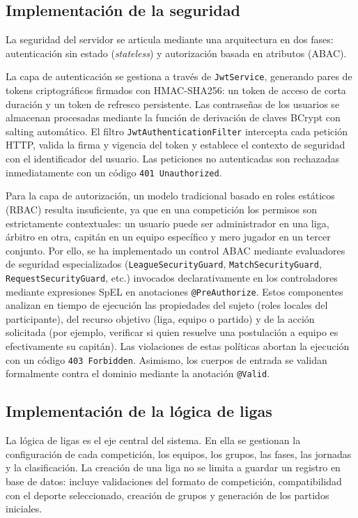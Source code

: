 \subsection{Implementación de la seguridad}
La seguridad del servidor se articula mediante una arquitectura en dos fases: autenticación sin estado (\textit{stateless}) y autorización basada en atributos (\ac{ABAC}). 

La capa de autenticación se gestiona a través de \texttt{JwtService}, generando pares de tokens criptográficos firmados con HMAC-SHA256: un token de acceso de corta duración y un token de refresco persistente. Las contraseñas de los usuarios se almacenan procesadas mediante la función de derivación de claves BCrypt con salting automático. El filtro \texttt{JwtAuthenticationFilter} intercepta cada petición HTTP, valida la firma y vigencia del token y establece el contexto de seguridad con el identificador del usuario. Las peticiones no autenticadas son rechazadas inmediatamente con un código \texttt{401 Unauthorized}.

Para la capa de autorización, un modelo tradicional basado en roles estáticos (\ac{RBAC}) resulta insuficiente, ya que en una competición los permisos son estrictamente contextuales: un usuario puede ser administrador en una liga, árbitro en otra, capitán en un equipo específico y mero jugador en un tercer conjunto. Por ello, se ha implementado un control \ac{ABAC} mediante evaluadores de seguridad especializados (\texttt{LeagueSecurityGuard}, \texttt{MatchSecurityGuard}, \texttt{RequestSecurityGuard}, etc.) invocados declarativamente en los controladores mediante expresiones SpEL en anotaciones \texttt{@PreAuthorize}. Estos componentes analizan en tiempo de ejecución las propiedades del sujeto (roles locales del participante), del recurso objetivo (liga, equipo o partido) y de la acción solicitada (por ejemplo, verificar si quien resuelve una postulación a equipo es efectivamente su capitán). Las violaciones de estas políticas abortan la ejecución con un código \texttt{403 Forbidden}. Asimismo, los cuerpos de entrada se validan formalmente contra el dominio mediante la anotación \texttt{@Valid}.

\subsection{Implementación de la lógica de ligas}
La lógica de ligas es el eje central del sistema. En ella se gestionan la configuración de cada competición, los equipos, los grupos, las fases, las jornadas y la clasificación. La creación de una liga no se limita a guardar un registro en base de datos: incluye validaciones del formato de competición, compatibilidad con el deporte seleccionado, creación de grupos y generación de los partidos iniciales.

